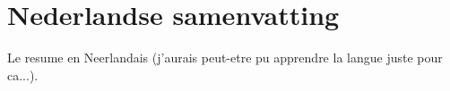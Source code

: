 \renewcommand{\thesection}{\arabic{section}}    %

\renewcommand{\bibname}{Referenties}
\renewcommand\evenpagerightmark{{\scshape\small Nederlandse Samenvatting}}
\renewcommand\oddpageleftmark{{\scshape\small Summary in Dutch}}

\chapter[Nederlandse samenvatting]%
{Nederlandse samenvatting \\}

\hyphenation{}
\def\hyph{-\penalty0\hskip0pt\relax}

Le resume en Neerlandais (j'aurais peut-etre pu apprendre la langue juste pour ca...).

\clearpage{\pagestyle{empty}\cleardoublepage}

\renewcommand*{\thesection}{\thechapter.\arabic{section}}       %



